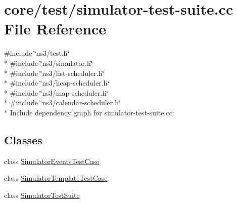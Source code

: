 \hypertarget{simulator-test-suite_8cc}{}\section{core/test/simulator-\/test-\/suite.cc File Reference}
\label{simulator-test-suite_8cc}
{\ttfamily \#include \char`\"{}ns3/test.\+h\char`\"{}}\\*
{\ttfamily \#include \char`\"{}ns3/simulator.\+h\char`\"{}}\\*
{\ttfamily \#include \char`\"{}ns3/list-\/scheduler.\+h\char`\"{}}\\*
{\ttfamily \#include \char`\"{}ns3/heap-\/scheduler.\+h\char`\"{}}\\*
{\ttfamily \#include \char`\"{}ns3/map-\/scheduler.\+h\char`\"{}}\\*
{\ttfamily \#include \char`\"{}ns3/calendar-\/scheduler.\+h\char`\"{}}\\*
Include dependency graph for simulator-\/test-\/suite.cc\+:
\subsection*{Classes}
\begin{DoxyCompactItemize}
\item 
class \hyperlink{classSimulatorEventsTestCase}{Simulator\+Events\+Test\+Case}
\item 
class \hyperlink{classSimulatorTemplateTestCase}{Simulator\+Template\+Test\+Case}
\item 
class \hyperlink{classSimulatorTestSuite}{Simulator\+Test\+Suite}
\end{DoxyCompactItemize}
